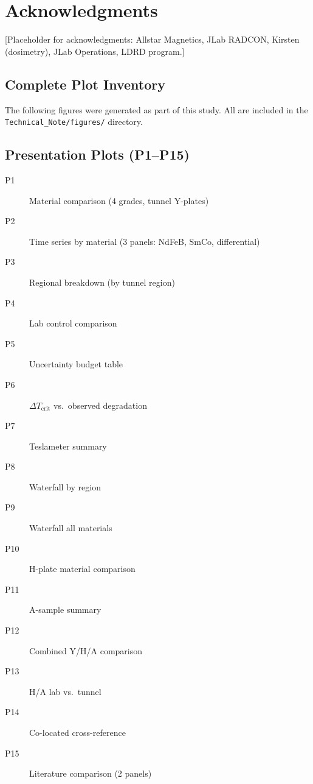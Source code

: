 \documentclass[11pt,letterpaper]{article}
\begin{document}
\section*{Acknowledgments}

[Placeholder for acknowledgments: Allstar Magnetics, JLab RADCON, Kirsten
(dosimetry), JLab Operations, LDRD program.]

\newpage
\begin{appendices}

\section{Complete Plot Inventory}
\label{app:plots}

The following figures were generated as part of this study. All are included
in the \texttt{Technical\_Note/figures/} directory.

\subsection{Presentation Plots (P1--P15)}
\begin{description}
    \item[P1] Material comparison (4 grades, tunnel Y-plates)
    \item[P2] Time series by material (3 panels: NdFeB, SmCo, differential)
    \item[P3] Regional breakdown (by tunnel region)
    \item[P4] Lab control comparison
    \item[P5] Uncertainty budget table
    \item[P6] $\Delta T_\mathrm{crit}$ vs.\ observed degradation
    \item[P7] Teslameter summary
    \item[P8] Waterfall by region
    \item[P9] Waterfall all materials
    \item[P10] H-plate material comparison
    \item[P11] A-sample summary
    \item[P12] Combined Y/H/A comparison
    \item[P13] H/A lab vs.\ tunnel
    \item[P14] Co-located cross-reference
    \item[P15] Literature comparison (2 panels)
\end{description}


\end{appendices}
\end{document}
